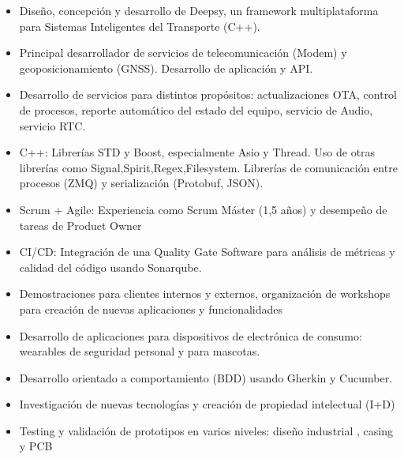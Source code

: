 \documentclass[10pt,a4paper,normalphoto,hidelinks]{altacv}
\begin{document}
\begin{paracol}{2}


\begin{itemize}
\item Diseño, concepción y desarrollo de Deepsy, un framework multiplataforma  para Sistemas Inteligentes del Transporte (C++).
\item Principal desarrollador de servicios de telecomunicación (Modem) y geoposicionamiento (GNSS). Desarrollo de aplicación y API.
\item Desarrollo de servicios para distintos propósitos: actualizaciones OTA, control de procesos, reporte automático del estado del equipo, servicio de Audio, servicio RTC. 
\item C++: Librerías STD y Boost, especialmente Asio y Thread. Uso de otras librerías como Signal,Spirit,Regex,Filesystem. Librerías de comunicación entre procesos (ZMQ) y  serialización (Protobuf, JSON).
\item Scrum + Agile: Experiencia como Scrum Máster (1,5 años) y desempeño de tareas de Product Owner
\item CI/CD: Integración de una Quality Gate Software para análisis de métricas y calidad del código usando Sonarqube.
\item Demostraciones para clientes internos y externos, organización de workshops para creación de nuevas aplicaciones y funcionalidades

\end{itemize}

\divider

\begin{itemize}
\item Desarrollo de aplicaciones para dispositivos de electrónica de consumo: wearables de seguridad personal y para mascotas. 
\item Desarrollo orientado a comportamiento (BDD) usando Gherkin y Cucumber.
\item Investigación de nuevas tecnologías y creación de propiedad intelectual (I+D)
\item Testing y validación de prototipos en varios niveles: diseño industrial , casing y PCB 
\end{itemize}



\end{paracol}
\end{document}
